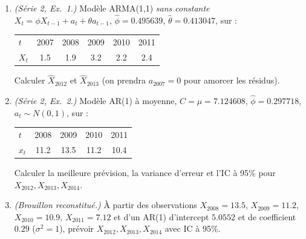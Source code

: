 \documentclass[11pt]{article}
\begin{document}
\begin{enumerate}[label=\textbf{Q\,E.\arabic*},leftmargin=*]
\item \emph{(Série 2, Ex.~1.)} Modèle ARMA(1,1) \emph{sans constante}
$X_t=\phi X_{t-1}+a_t+\theta a_{t-1}$, $\hat\phi=0.495639$, $\hat\theta=0.413047$, sur :
\begin{center}\small
\begin{tabular}{lccccc}\toprule
$t$&2007&2008&2009&2010&2011\\ $X_t$&1.5&1.9&3.2&2.2&2.4\\\bottomrule
\end{tabular}
\end{center}
Calculer $\widehat X_{2012}$ et $\widehat X_{2013}$ (on prendra $a_{2007}=0$ pour amorcer les
résidus).

\item \emph{(Série 2, Ex.~2.)} Modèle AR(1) à moyenne, $C=\mu=7.124608$, $\hat\phi=0.297718$,
$a_t\sim N(0,1)$, sur :
\begin{center}\small
\begin{tabular}{lcccc}\toprule
$t$&2008&2009&2010&2011\\ $x_t$&11.2&13.5&11.2&10.4\\\bottomrule
\end{tabular}
\end{center}
Calculer la meilleure prévision, la variance d'erreur et l'IC à 95\% pour
$X_{2012},X_{2013},X_{2014}$.

\item \emph{(Brouillon reconstitué.)} À partir des observations $X_{2008}=13.5$,
$X_{2009}=11.2$, $X_{2010}=10.9$, $X_{2011}=7.12$ et d'un AR(1) d'intercept $5.0552$ et de
coefficient $0.29$ ($\sigma^2=1$), prévoir $X_{2012},X_{2013},X_{2014}$ avec IC à 95\%.
\end{enumerate}

\end{document}
